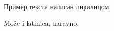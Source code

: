 \documentclass{article}
\begin{document}
Пример текста написан ћирилицом.

Može i latinica, naravno.
\end{document}
